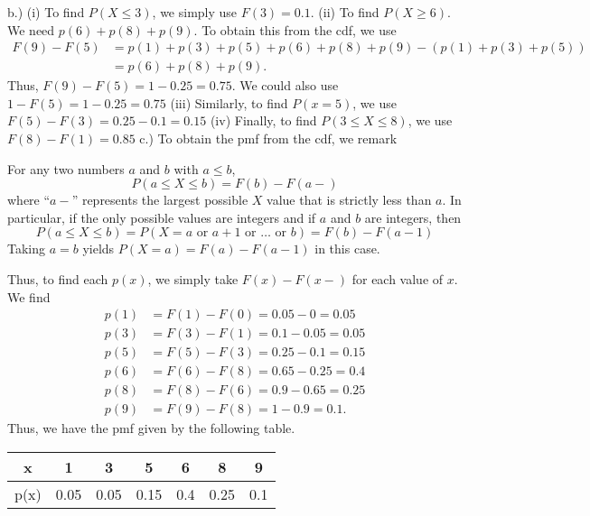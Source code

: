 \documentclass{report}
\begin{document}
    \bigbreak \noindent 
    b.)\bigbreak \noindent 
    (i) To find $P(X \leq 3)$, we simply use $F(3) = 0.1$.
    \bigbreak \noindent 
    (ii) To find $P(X \geq 6)$. We need $p(6) + p(8) + p(9)$. To obtain this from the cdf, we use
    \begin{align*}
        F(9) - F(5) &= p(1) + p(3) + p(5) + p(6) + p(8) + p(9) - (p(1) + p(3) + p(5)) \\
                    &=p(6) + p(8) + p(9) 
    .\end{align*}
    Thus, $F(9) - F(5)  = 1- 0.25 = 0.75$. We could also use $1-F(5) = 1-0.25 = 0.75$ 
    \bigbreak \noindent 
    (iii) Similarly, to find $P(x=5)$, we use $F(5) - F(3) = 0.25 - 0.1 = 0.15$
    \bigbreak \noindent 
    (iv) Finally, to find $P(3 \leq X \leq 8)$, we use $F(8) - F(1) = 0.85$
    \bigbreak \noindent 
    c.) To obtain the pmf from the cdf, we remark
    \bigbreak \noindent 
    \begin{remark}
        For any two numbers \(a\) and \(b\) with \(a \leq b\),
        \[
            P(a \leq X \leq b) = F(b) - F(a-)
        \]
        where “\(a-\)” represents the largest possible \(X\) value that is strictly less than \(a\). In particular, if the only possible values are integers and if \(a\) and \(b\) are integers, then
        \[
            P(a \leq X \leq b) = P(X = a \text{ or } a + 1 \text{ or } \ldots \text{ or } b) = F(b) - F(a-1)
        \]
        Taking \(a = b\) yields \(P(X = a) = F(a) - F(a-1)\) in this case.
        \bigbreak \noindent 
    \end{remark}
    \bigbreak \noindent 
    Thus, to find each $p(x)$, we simply take $F(x) - F(x-)$ for each value of $x$. We find
    \begin{align*}
        p(1) &= F(1) - F(0) = 0.05 - 0 = 0.05 \\
        p(3) &= F(3) - F(1) = 0.1 - 0.05 = 0.05 \\
        p(5) &= F(5) - F(3) = 0.25 - 0.1 = 0.15 \\
        p(6) &= F(6) - F(8) = 0.65 - 0.25 = 0.4 \\
        p(8) &= F(8) - F(6) = 0.9 - 0.65 = 0.25 \\
        p(9) &= F(9) - F(8) = 1-0.9 = 0.1
    .\end{align*}
    \bigbreak \noindent 
    Thus, we have the pmf given by the following table.
    \bigbreak \noindent 
    \begin{center}
        \begin{tabular}{c|cccccc}
            x & 1 & 3 & 5 & 6 & 8 & 9 \\ 
            \hline
            p(x) & 0.05 & 0.05 & 0.15 & 0.4 & 0.25 & 0.1
        \end{tabular}
    \end{center}
    




 
\end{document}
